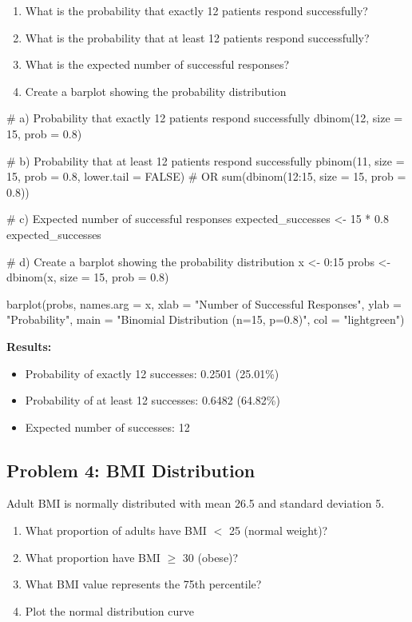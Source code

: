 \documentclass[11pt]{article}
\begin{document}
\begin{enumerate}[label=\alph*)]
\item What is the probability that exactly 12 patients respond successfully?
\item What is the probability that at least 12 patients respond successfully?
\item What is the expected number of successful responses?
\item Create a barplot showing the probability distribution
\end{enumerate}

\begin{answerbox}
\begin{rcode}
# a) Probability that exactly 12 patients respond successfully
dbinom(12, size = 15, prob = 0.8)

# b) Probability that at least 12 patients respond successfully
pbinom(11, size = 15, prob = 0.8, lower.tail = FALSE)
# OR
sum(dbinom(12:15, size = 15, prob = 0.8))

# c) Expected number of successful responses
expected_successes <- 15 * 0.8
expected_successes

# d) Create a barplot showing the probability distribution
x <- 0:15
probs <- dbinom(x, size = 15, prob = 0.8)

barplot(probs,
        names.arg = x,
        xlab = "Number of Successful Responses",
        ylab = "Probability",
        main = "Binomial Distribution (n=15, p=0.8)",
        col = "lightgreen")
\end{rcode}

\textbf{Results:}
\begin{itemize}
\item Probability of exactly 12 successes: 0.2501 (25.01\%)
\item Probability of at least 12 successes: 0.6482 (64.82\%)
\item Expected number of successes: 12
\end{itemize}
\end{answerbox}

\subsection{Problem 4: BMI Distribution}

Adult BMI is normally distributed with mean 26.5 and standard deviation 5.

\begin{enumerate}[label=\alph*)]
\item What proportion of adults have BMI $<$ 25 (normal weight)?
\item What proportion have BMI $\geq$ 30 (obese)?
\item What BMI value represents the 75th percentile?
\item Plot the normal distribution curve
\end{enumerate}
\end{document}

